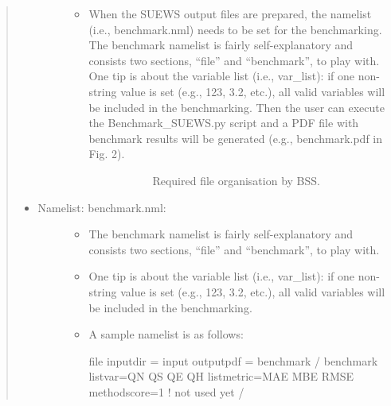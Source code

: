 \documentclass[letterpaper,10pt,english]{sphinxmanual}
\begin{document}
\begin{quote}
\begin{itemize}
\begin{description}
\begin{itemize}
\item {} \begin{description}
\item[{When the SUEWS output files are prepared, the namelist (i.e., benchmark.nml) needs to be set for the benchmarking. The benchmark namelist is fairly self-explanatory and consists two sections, “file” and “benchmark”, to play with. One tip is about the variable list (i.e., var\_list): if one non-string value is set (e.g., 123, 3.2, etc.), all valid variables will be included in the benchmarking. Then the user can execute the Benchmark\_SUEWS.py script and a PDF file with benchmark results will be generated (e.g., benchmark.pdf in Fig. 2).}] \leavevmode
\begin{figure}[htbp]
\centering
\capstart

\noindent{}
\caption{Required file organisation by BSS.}\label{\detokenize{post_processor/Benchmark System:id2}}\end{figure}

\end{description}

\end{itemize}

\end{description}

\item {} \begin{description}
\item[{Namelist: benchmark.nml:}] \leavevmode\begin{itemize}
\item {} 
The benchmark namelist is fairly self-explanatory and consists two sections, “file” and “benchmark”, to play with.

\item {} 
One tip is about the variable list (i.e., var\_list): if one non-string value is set (e.g., 123, 3.2, etc.), all valid variables will be included in the benchmarking.

\item {} 
A sample namelist is as follows:

%
\begin{sphinxVerbatim}[commandchars=\\\{\}]
\PYGZam{}file
  input\PYGZus{}dir = \PYGZsq{}input\PYGZsq{}
  output\PYGZus{}pdf = \PYGZsq{}benchmark\PYGZsq{}
/
\PYGZam{}benchmark
  list\PYGZus{}var=\PYGZsq{}QN\PYGZsq{} \PYGZsq{}QS\PYGZsq{} \PYGZsq{}QE\PYGZsq{} \PYGZsq{}QH\PYGZsq{}
  list\PYGZus{}metric=\PYGZsq{}MAE\PYGZsq{} \PYGZsq{}MBE\PYGZsq{} \PYGZsq{}RMSE\PYGZsq{}
  method\PYGZus{}score=1 ! not used yet
/
\end{sphinxVerbatim}


\end{itemize}
\end{description}
\end{itemize}
\end{quote}
\end{document}
